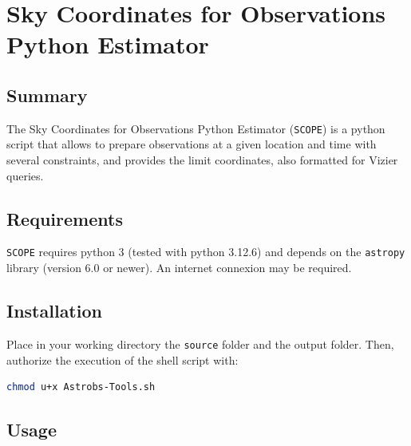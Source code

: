 \documentclass[10pt, a4paper]{article} %
\begin{document}
\begin{abstract}
     Astrobs Tools is a suite of tools for astronomical observations. \texttt{SCOPE} is a python script that allows to prepare observations at a given location and time with several constraints, and provides the limit coordinates, also formatted for Vizier queries. Other tools will later be added.
     \bigskip

     \noindent\textbf{Key words.} Tool, astronomical observations, script, coordinate system, query.
\end{abstract}

\section{Sky Coordinates for Observations Python Estimator}

\subsection{Summary}

The Sky Coordinates for Observations Python Estimator (\texttt{SCOPE}) is a python script that allows to prepare observations at a given location and time with several constraints, and provides the limit coordinates, also formatted for Vizier queries.

\subsection{Requirements}

\texttt{SCOPE} requires python 3 (tested with python 3.12.6) and depends on the \texttt{astropy} library (version 6.0 or newer). An internet connexion may be required.

\subsection{Installation}

Place in your working directory the \texttt{source} folder and the output folder. Then, authorize the execution of the shell script with:
\begin{lstlisting}[language=bash]
chmod u+x Astrobs-Tools.sh
\end{lstlisting}

\subsection{Usage}
\end{document}
